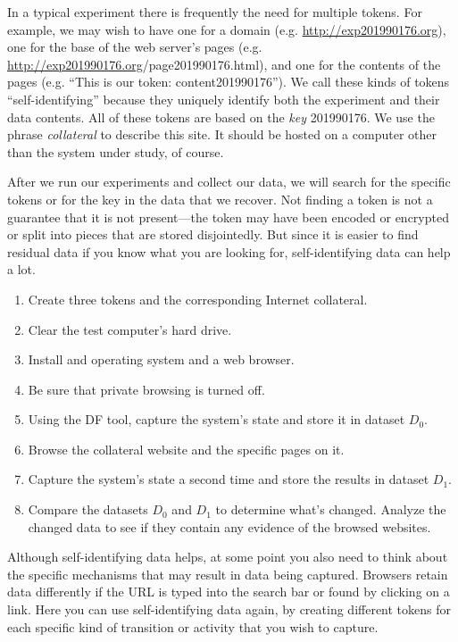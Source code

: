 In a typical experiment there is frequently the need for multiple
tokens. For example, we may wish to have one for a domain
(e.g. \url{http://exp201990176.org}), one for the base of the web
server's pages
(e.g. \url{http://exp201990176.org}/page201990176.html), and one for
the contents of the pages (e.g. ``This is our token:
  content201990176'').  We call these kinds of tokens
  ``self-identifying'' because they uniquely identify both the
  experiment and their data contents. All of these tokens are based on
  the \emph{key} 201990176. We use the phrase
  \emph{collateral} to describe this site. It should be hosted on a
 computer other than the system under study, of course.

After we run our experiments and collect our data, we will search for
the specific tokens or for the key in the data that we recover. Not
finding a token is not a guarantee that it is not present---the token
may have been encoded or encrypted or split into pieces that are
stored disjointedly. But since it is easier to find residual data if
you know what you are looking for, self-identifying data can help a
lot.

\label{protocol:background}
\begin{enumerate}
\item Create three tokens and the corresponding Internet collateral.
\item Clear the test computer's hard drive.
\item Install and operating system and a web browser.
\item Be sure that private browsing is turned off.
\item Using the DF tool, capture the system's state and store it in dataset $D_0$.
\item Browse the collateral website
 and the specific pages on it.
\item Capture the system's state a second time and store the results in dataset $D_1$.
\item Compare the datasets $D_0$ and $D_1$ to determine what's
  changed. Analyze the changed data to see if they contain any
  evidence of the browsed websites. 
\end{enumerate}


Although self-identifying data helps, at some point you also need to
think about the specific mechanisms that may result in data being
captured. Browsers retain data differently if the URL is typed
into the search bar or found by clicking on a link. Here you can use
self-identifying data again, by creating different tokens for each
specific kind of transition or activity that you wish to capture. 

